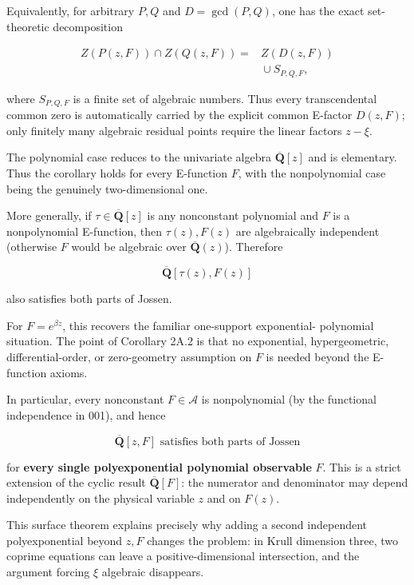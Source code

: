 \documentclass[11pt]{article}
\theoremstyle{keio}
\theoremstyle{definition}
\theoremstyle{remark}
\begin{document}
Equivalently, for arbitrary \(P,Q\) and
\(D=\gcd(P,Q)\), one has the exact set-theoretic decomposition

\[
 \begin{aligned}
 Z(P(z,F))\cap Z(Q(z,F))
  ={}& Z(D(z,F))\\
    &{}\cup S_{P,Q,F},
 \end{aligned}                                                \tag{J-2A.3}
\]

where \(S_{P,Q,F}\) is a finite set of algebraic numbers. Thus every
transcendental common zero is automatically carried by the explicit common
E-factor \(D(z,F)\); only finitely many algebraic residual points require the
linear factors \(z-\xi\).

The polynomial case reduces to the univariate algebra
\(\overline{\mathbf Q}[z]\) and is elementary. Thus the corollary holds for
every E-function \(F\), with the nonpolynomial case being the genuinely
two-dimensional one.

More generally, if \(\tau\in\overline{\mathbf Q}[z]\) is any nonconstant
polynomial and \(F\) is a nonpolynomial E-function, then \(\tau(z),F(z)\)
are algebraically independent (otherwise \(F\) would be algebraic over
\(\overline{\mathbf Q}(z)\)). Therefore

\[
  \overline{\mathbf Q}[\tau(z),F(z)]
\]

also satisfies both parts of Jossen.

For \(F=e^{\beta z}\), this recovers the familiar one-support exponential-
polynomial situation. The point of Corollary 2A.2 is that no exponential,
hypergeometric, differential-order, or zero-geometry assumption on \(F\) is
needed beyond the E-function axioms.

In particular, every nonconstant \(F\in\mathscr A\) is nonpolynomial (by the
functional independence in 001), and hence

\[
  \boxed{\overline{\mathbf Q}[z,F]\text{ satisfies both parts of Jossen}}
                                                                  \tag{J-2A.4}
\]

for \textbf{every single polyexponential polynomial observable} \(F\). This is a
strict extension of the cyclic result
\(\overline{\mathbf Q}[F]\): the numerator and denominator may depend
independently on the physical variable \(z\) and on \(F(z)\).

This surface theorem explains precisely why adding a second independent
polyexponential beyond \(z,F\) changes the problem: in Krull dimension three,
two coprime equations can leave a positive-dimensional intersection, and the
argument forcing \(\xi\) algebraic disappears.
\end{document}
